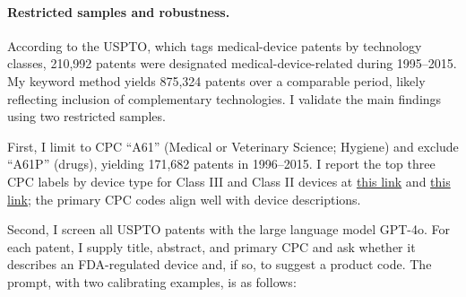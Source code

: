\documentclass[letterpaper,12pt]{article}
\theoremstyle{definition}
\begin{document}
\paragraph{Restricted samples and robustness.}\label{sec:appendixPatentCollectionRobustness}

According to the USPTO,\footnotemark
{} which tags medical-device patents by technology classes, 210{,}992 patents were designated medical-device-related during 1995--2015. My keyword method yields 875{,}324 patents over a comparable period, likely reflecting inclusion of complementary technologies. I validate the main findings using two restricted samples.


First, I limit to CPC “A61\*” (Medical or Veterinary Science; Hygiene) and exclude “A61P” (drugs), yielding 171{,}682 patents in 1996–2015. I report the top three CPC labels by device type for Class III and Class II devices at \href{https://parkerrogers.github.io/Data/3_to_2_PCS_w_CPCdesc.csv}{this link} and \href{https://parkerrogers.github.io/Data/2_to_1_PCS_w_CPCdesc.csv}{this link}; the primary CPC codes align well with device descriptions.


Second, I screen all USPTO patents with the large language model GPT-4o. For each patent, I supply title, abstract, and primary CPC and ask whether it describes an FDA-regulated device and, if so, to suggest a product code. The prompt, with two calibrating examples, is as follows:
\end{document}
